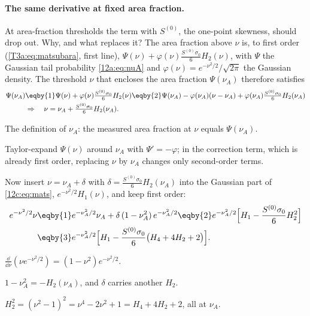 \paragraph{The same derivative at fixed area fraction.} At area-fraction thresholds the term with $S^{(0)}$, the
one-point skewness, should drop out. Why, and what replaces it? The area fraction above $\nu$ is, to first order
(\eqref{T3a:eq:matsubara}, first line), $\Psi(\nu)+\varphi(\nu)\frac{S^{(0)}\sigma_0}{6}H_2(\nu)$, with $\Psi$ the Gaussian
tail probability \eqref{12a:eq:nuA} and $\varphi(\nu)=e^{-\nu^2/2}/\sqrt{2\pi}$ the Gaussian density. The threshold $\nu$
that encloses the area fraction $\Psi(\nu_A)$ therefore satisfies
\begin{align}
  \Psi(\nu_A)
  &\eqby{1}\Psi(\nu)+\varphi(\nu)\tfrac{S^{(0)}\sigma_0}{6}H_2(\nu)
   \eqby{2}\Psi(\nu_A)-\varphi(\nu_A)(\nu-\nu_A)+\varphi(\nu_A)\tfrac{S^{(0)}\sigma_0}{6}H_2(\nu_A)\nonumber\\
  &\Rightarrow\quad \nu=\nu_A+\tfrac{S^{(0)}\sigma_0}{6}H_2(\nu_A) .
  \label{12c:eq:nuA-shift}
\end{align}
\begin{explain}
  \item The definition of $\nu_A$: the measured area fraction at $\nu$ equals $\Psi(\nu_A)$.
  \item Taylor-expand $\Psi(\nu)$ around $\nu_A$ with $\Psi'=-\varphi$; in the correction term, which is already first
        order, replacing $\nu$ by $\nu_A$ changes only second-order terms.
\end{explain}
Now insert $\nu=\nu_A+\delta$ with $\delta=\frac{S^{(0)}\sigma_0}{6}H_2(\nu_A)$ into the Gaussian part of
\eqref{12c:eq:mats}, $e^{-\nu^2/2}H_1(\nu)$, and keep first order:
\begin{align}
  e^{-\nu^2/2}\nu
  &\eqby{1}e^{-\nu_A^2/2}\nu_A+\delta\,(1-\nu_A^2)\,e^{-\nu_A^2/2}
   \eqby{2}e^{-\nu_A^2/2}\Bigl[H_1-\frac{S^{(0)}\sigma_0}{6}H_2^2\Bigr]\nonumber\\
  &\eqby{3}e^{-\nu_A^2/2}\Bigl[H_1-\frac{S^{(0)}\sigma_0}{6}\bigl(H_4+4H_2+2\bigr)\Bigr] .
  \nonumber
\end{align}
\begin{explain}
  \item $\frac{\dd}{\dd\nu}(\nu e^{-\nu^2/2})=(1-\nu^2)e^{-\nu^2/2}$.
  \item $1-\nu_A^2=-H_2(\nu_A)$, and $\delta$ carries another $H_2$.
  \item $H_2^2=(\nu^2-1)^2=\nu^4-2\nu^2+1=H_4+4H_2+2$, all at $\nu_A$.
\end{explain}

